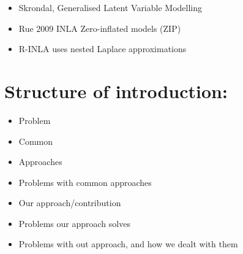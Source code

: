 \documentclass{article}
\begin{document}
\begin{itemize}
\item Skrondal, Generalised Latent Variable Modelling
\item Rue 2009 INLA Zero-inflated models (ZIP)
\item R-INLA uses nested Laplace approximations
\end{itemize}

\section{Structure of introduction:}
\begin{itemize}
\item Problem
\item Common
\item Approaches
\item Problems with common approaches
\item Our approach/contribution
\item Problems our approach solves
\item Problems with out approach, and how we dealt with them
\end{itemize}
\end{document}
